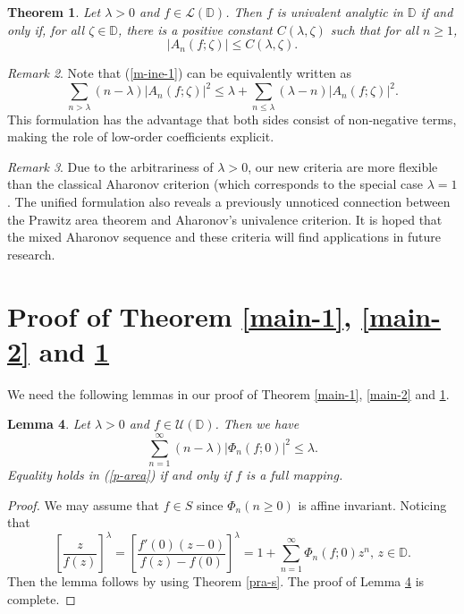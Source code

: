 \documentclass[10pt]{amsart}
\newtheorem{theorem}{Theorem}[section]
\newtheorem{lemma}[theorem]{Lemma}
\theoremstyle{definition}
\theoremstyle{remark}
\newtheorem{remark}[theorem]{Remark}
\numberwithin{equation}{section}
\begin{document}
\begin{theorem}\label{main-3}
Let $\lambda>0$ and $f \in \mathcal{L}(\mathbb{D})$. Then $f$ is univalent analytic in $\mathbb{D}$ if and only if, for all $\zeta\in \mathbb{D}$, there is a positive constant $C(\lambda, \zeta)$ such that for all $n\geq 1$,
\begin{equation}\label{m-ine-3}\left|A_n(f; \zeta)\right|\leq C(\lambda, \zeta).
\end{equation}
\end{theorem}

\begin{remark}
Note that (\ref{m-ine-1}) can be equivalently written as
\begin{equation} 
\sum_{n>\lambda}(n-\lambda)\left|A_n(f; \zeta)\right|^2\leq \lambda+\sum_{n\leq \lambda}(\lambda-n)\left|A_n(f; \zeta)\right|^2. \nonumber
\end{equation}
This formulation has the advantage that both sides consist of non‑negative terms, making the role of low‑order coefficients explicit.
\end{remark}
\begin{remark}
Due to the arbitrariness of $\lambda>0$, our new criteria are more flexible than the classical Aharonov criterion (which corresponds to the special case $\lambda=1$. The unified formulation also reveals a previously unnoticed connection between the Prawitz area theorem and Aharonov’s univalence criterion. It is hoped that the mixed Aharonov sequence and these criteria will find applications in future research.
\end{remark}

\section{\bf Proof of Theorem \ref{main-1},  \ref{main-2} and \ref{main-3}}
We need the following lemmas in our proof of Theorem \ref{main-1},  \ref{main-2} and \ref{main-3}.
\begin{lemma}\label{lemma-1}
Let  $\lambda>0$ and $f\in \mathcal{U}(\mathbb{D})$. Then we have
 \begin{equation}\label{p-area}
 \sum_{n=1}^{\infty}(n-\lambda)|\Phi_n(f; 0)|^2\leq \lambda.
 \end{equation}
 Equality holds in (\ref{p-area}) if and only if $f$ is a full mapping.
\end{lemma}
\begin{proof}
We may assume that $f\in S$ since $\Phi_n(n\geq 0)$ is affine invariant.  Noticing that
\begin{equation}\label{l-1}
\left[\frac{z}{f(z)}\right]^{\lambda}=\left[\frac{f'(0)(z-0)}{f(z)-f(0)}\right]^{\lambda}=1+\sum_{n=1}^{\infty}\Phi_{n}(f; 0)z^n, \, z\in \mathbb{D}.
\end{equation}  
Then the lemma follows by using Theorem \ref{pra-s}.  The proof of Lemma \ref{lemma-1} is complete.
\end{proof}
\end{document}
